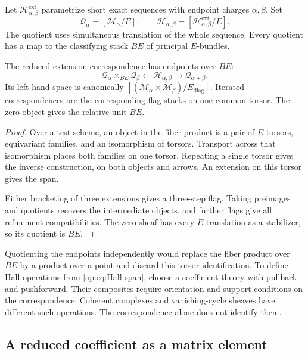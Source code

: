 Let $\mathcal H^{\mathrm{ext}}_{\alpha,\beta}$ parametrize
short exact sequences with endpoint charges $\alpha,\beta$.
Set
\[
 \mathcal Q_\alpha=[\mathcal M_\alpha/E],\qquad
 \mathcal H_{\alpha,\beta}
     =[\mathcal H^{\mathrm{ext}}_{\alpha,\beta}/E].
\]
The quotient uses simultaneous translation of the whole sequence.
Every quotient has a map to the classifying stack $BE$ of
principal $E$-bundles.

\begin{proposition}\label{op:prop:common-torsor}
The reduced extension correspondence has endpoints over $BE$:
\begin{equation}\label{op:eq:Hall-span}
 \mathcal Q_\alpha\times_{BE}\mathcal Q_\beta
       \longleftarrow\mathcal H_{\alpha,\beta}
       \longrightarrow\mathcal Q_{\alpha+\beta}.
\end{equation}
Its left-hand space is canonically
$[(\mathcal M_\alpha\times\mathcal M_\beta)/E_{\mathrm{diag}}]$.
Iterated correspondences are the corresponding flag stacks on
one common torsor. The zero object gives the relative unit $BE$.
\end{proposition}

\begin{proof}
Over a test scheme, an object in the fiber product is a pair of
$E$-torsors, equivariant families, and an isomorphism of torsors.
Transport across that isomorphism places both families on one torsor.
Repeating a single torsor gives the inverse construction, on both
objects and arrows. An extension on this torsor gives the span.

Either bracketing of three extensions gives a three-step flag.
Taking preimages and quotients recovers the intermediate objects,
and further flags give all refinement compatibilities.
The zero sheaf has every $E$-translation as a stabilizer, so its
quotient is $BE$.
\end{proof}

Quotienting the endpoints independently would replace the fiber
product over $BE$ by a product over a point and discard this
torsor identification. To define Hall operations from
\eqref{op:eq:Hall-span}, choose a coefficient theory with pullback
and pushforward. Their composites require orientation and support
conditions on the correspondence.
Coherent complexes and vanishing-cycle sheaves have different
such operations. The correspondence alone does not identify them.

\subsection{A reduced coefficient as a matrix element}

